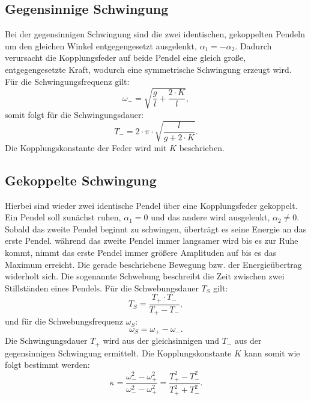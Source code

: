 \subsection{Gegensinnige Schwingung}
Bei der gegensinnigen Schwingung sind die zwei identischen, gekoppelten Pendeln um den gleichen Winkel entgegengesetzt ausgelenkt, $\alpha_1 = - \alpha_2$.
Dadurch verursacht die Kopplungsfeder auf beide Pendel eine gleich große, entgegengesetzte Kraft, wodurch eine symmetrische Schwingung erzeugt wird.
Für die Schwingungsfrequenz gilt:
\begin{equation*}
    \omega_- = \sqrt{\frac{g}{l} + \frac{2 \cdot K}{l}},
\end{equation*}
somit folgt für die Schwingungsdauer:
\begin{equation} \label{eqn:Tminus}
    T_- =2 \cdot \pi \cdot \sqrt{\frac{l}{g + 2 \cdot K}}.
\end{equation}
Die Kopplungskonstante der Feder wird mit $K$ beschrieben.

\subsection{Gekoppelte Schwingung}
Hierbei sind wieder zwei identische Pendel über eine Kopplungsfeder gekoppelt.
Ein Pendel soll zunächst ruhen, $\alpha_1 = 0$ und das andere wird ausgelenkt, $\alpha_2 \neq 0$.
Sobald das zweite Pendel beginnt zu schwingen, überträgt es seine Energie an das erste Pendel.
während das zweite Pendel immer langsamer wird bis es zur Ruhe kommt, nimmt das erste Pendel immer größere Amplituden auf bis es das Maximum erreicht.
Die gerade beschriebene Bewegung bzw. der Energieübertrag widerholt sich.
Die sogenannte Schwebung beschreibt die Zeit zwischen zwei Stillständen eines Pendels.
Für die Schwebungsdauer $T_S$ gilt:
\begin{equation}\label{eqn:Ts}
    T_S = \frac{T_+ \cdot T_-}{T_+ - T_-},
\end{equation}
und für die Schwebungsfrequenz $\omega_S$:
\begin{equation} \label{eqn:ws}
    \omega_S = \omega_+ - \omega_-.
\end{equation}
Die Schwingungsdauer $T_+$ wird aus der gleichsinnigen und $T_-$ aus der gegensinnigen Schwingung ermittelt.
Die Kopplungskonstante $K$ kann somit wie folgt bestimmt werden:
\begin{equation} \label{eqn:kappa}
    \kappa = \frac{\omega_-^2 - \omega_+^2}{\omega_-^2 - \omega_+^2} = \frac{T_+^2 - T_-^2}{T_+^2 + T_-^2}.
\end{equation}